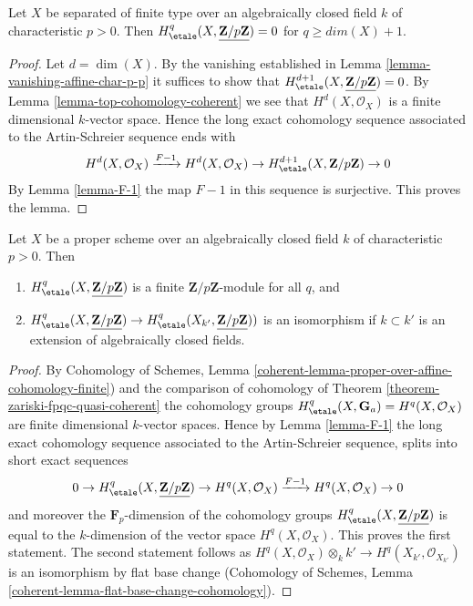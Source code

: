 \begin{lemma}
\label{lemma-vanishing-variety-char-p-p}
Let $X$ be separated of finite type over an algebraically closed
field $k$ of characteristic $p > 0$. Then
$H_\etale^q(X, \underline{\mathbf{Z}/p\mathbf{Z}}) = 0$ for
$q \geq dim(X) + 1$.
\end{lemma}

\begin{proof}
Let $d = \dim(X)$. By the vanishing established in
Lemma \ref{lemma-vanishing-affine-char-p-p}
it suffices to show that
$H_\etale^{d + 1}(X, \underline{\mathbf{Z}/p\mathbf{Z}}) = 0$.
By Lemma \ref{lemma-top-cohomology-coherent} we see that
$H^d(X, \mathcal{O}_X)$ is a finite dimensional $k$-vector space.
Hence the long exact cohomology sequence associated to the
Artin-Schreier sequence ends with
$$
H^d(X, \mathcal{O}_X) \xrightarrow{F - 1}
H^d(X, \mathcal{O}_X) \to H^{d + 1}_\etale(X, \mathbf{Z}/p\mathbf{Z}) \to 0
$$
By Lemma \ref{lemma-F-1} the map $F - 1$ in this sequence is surjective.
This proves the lemma.
\end{proof}

\begin{lemma}
\label{lemma-finiteness-proper-variety-char-p-p}
Let $X$ be a proper scheme over an algebraically closed
field $k$ of characteristic $p > 0$. Then
\begin{enumerate}
\item $H_\etale^q(X, \underline{\mathbf{Z}/p\mathbf{Z}})$
is a finite $\mathbf{Z}/p\mathbf{Z}$-module for all $q$, and
\item $H^q_\etale(X, \underline{\mathbf{Z}/p\mathbf{Z}}) \to
H^q_\etale(X_{k'}, \underline{\mathbf{Z}/p\mathbf{Z}}))$
is an isomorphism if $k \subset k'$ is an extension of algebraically
closed fields.
\end{enumerate}
\end{lemma}

\begin{proof}
By Cohomology of Schemes, Lemma
\ref{coherent-lemma-proper-over-affine-cohomology-finite})
and the comparison of cohomology of
Theorem \ref{theorem-zariski-fpqc-quasi-coherent} the cohomology groups
$H^q_\etale(X, \mathbf{G}_a) = H^q(X, \mathcal{O}_X)$ are
finite dimensional $k$-vector spaces. Hence by
Lemma \ref{lemma-F-1} the long exact cohomology sequence
associated to the Artin-Schreier sequence, splits into
short exact sequences
$$
0 \to H_\etale^q(X, \underline{\mathbf{Z}/p\mathbf{Z}}) \to
H^q(X, \mathcal{O}_X) \xrightarrow{F - 1} H^q(X, \mathcal{O}_X) \to 0
$$
and moreover the $\mathbf{F}_p$-dimension of the cohomology groups
$H_\etale^q(X, \underline{\mathbf{Z}/p\mathbf{Z}})$ is equal to the
$k$-dimension of the vector space $H^q(X, \mathcal{O}_X)$.
This proves the first statement. The second statement follows
as $H^q(X, \mathcal{O}_X) \otimes_k k' \to H^q(X_{k'}, \mathcal{O}_{X_{k'}})$
is an isomorphism by flat base change
(Cohomology of Schemes,
Lemma \ref{coherent-lemma-flat-base-change-cohomology}).
\end{proof}








